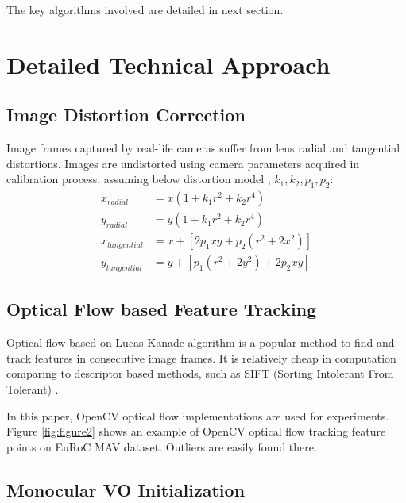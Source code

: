 \documentclass[10pt,twocolumn,letterpaper]{article}
\begin{document}
The key algorithms involved are detailed in next section. 


\section{Detailed Technical Approach}


\subsection{Image Distortion Correction}

Image frames captured by real-life cameras suffer from lens radial and tangential distortions. Images are undistorted using camera parameters acquired in calibration process, assuming below distortion model \cite{OpenCV_img_undistort}, $k_1, k_2, p_1, p_2$:
\begin{align*} 
x_{radial} &= x(1+k_1 r^2 + k_2 r^4) \\ 
y_{radial} &= y(1+k_1 r^2 + k_2 r^4) \\ 
x_{tangential} &= x + [2 p_1 x y + p_2 (r^2 + 2 x^2)] \\ 
y_{tangential} &= y + [p_1 (r^2 + 2 y^2) + 2 p_2 x y]
\label{eq:2}
\end{align*} 



\subsection{Optical Flow based Feature Tracking}\label{optical_flow_subsection}


Optical flow based on Lucas-Kanade algorithm \cite{Lucas-1981-15101} is a popular method to find and track features in consecutive image frames. It is relatively cheap in computation comparing to descriptor based methods, such as SIFT (Sorting Intolerant From Tolerant) \cite{Lowe04distinctiveimage}. 

In this paper, OpenCV optical flow implementations \cite{OpenCV_optical_flow} are used for experiments. Figure \ref{fig:figure2} shows an example of OpenCV optical flow tracking feature points on EuRoC MAV dataset. Outliers are easily found there. 

\subsection{Monocular VO Initialization}
\end{document}
